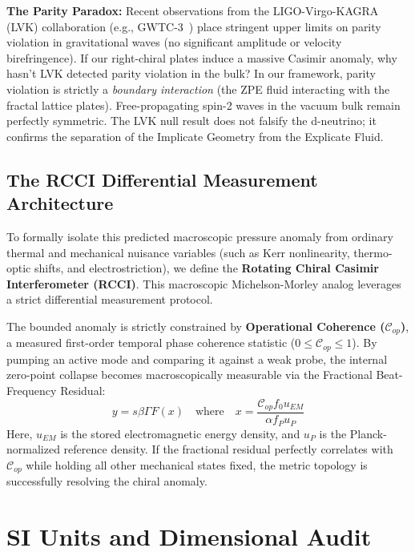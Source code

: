 \textbf{The Parity Paradox:} Recent observations from the LIGO-Virgo-KAGRA (LVK) collaboration (e.g., GWTC-3~\cite{LVK_GWTC3}) place stringent upper limits on parity violation in gravitational waves (no significant amplitude or velocity birefringence). If our right-chiral plates induce a massive Casimir anomaly, why hasn't LVK detected parity violation in the bulk? In our framework, parity violation is strictly a \emph{boundary interaction} (the ZPE fluid interacting with the fractal lattice plates). Free-propagating spin-2 waves in the vacuum bulk remain perfectly symmetric. The LVK null result does not falsify the d-neutrino; it confirms the separation of the Implicate Geometry from the Explicate Fluid.

\subsection{The RCCI Differential Measurement Architecture}\label{sec:rcci}

To formally isolate this predicted macroscopic pressure anomaly from ordinary thermal and mechanical nuisance variables (such as Kerr nonlinearity, thermo-optic shifts, and electrostriction), we define the \textbf{Rotating Chiral Casimir Interferometer (RCCI)}. This macroscopic Michelson-Morley analog leverages a strict differential measurement protocol.

The bounded anomaly is strictly constrained by \textbf{Operational Coherence ($\mathcal{C}_{op}$)}, a measured first-order temporal phase coherence statistic ($0 \le \mathcal{C}_{op} \le 1$). By pumping an active mode and comparing it against a weak probe, the internal zero-point collapse becomes macroscopically measurable via the Fractional Beat-Frequency Residual:
\begin{equation}
    y = s \beta \Gamma F(x) \quad \text{where} \quad x = \frac{\mathcal{C}_{op} f_0 u_{EM}}{\alpha f_P u_P}
\end{equation}
Here, $u_{EM}$ is the stored electromagnetic energy density, and $u_P$ is the Planck-normalized reference density. If the fractional residual perfectly correlates with $\mathcal{C}_{op}$ while holding all other mechanical states fixed, the metric topology is successfully resolving the chiral anomaly.

\section{SI Units and Dimensional Audit}\label{sec:units}

